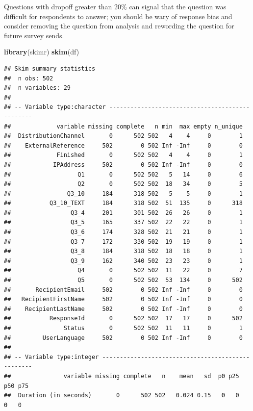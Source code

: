 \documentclass[]{book}
\newenvironment{Shaded}{\begin{snugshade}}{\end{snugshade}}
\newcommand{\KeywordTok}[1]{\textcolor[rgb]{0.13,0.29,0.53}{\textbf{#1}}}
\newcommand{\NormalTok}[1]{#1}
\begin{document}
Questions with dropoff greater than 20\% can signal that the question
was difficult for respondents to answer; you should be wary of response
bias and consider removing the question from analysis and rewording the
question for future survey sends.

\begin{Shaded}
\begin{Highlighting}[]
\KeywordTok{library}\NormalTok{(skimr)}
\KeywordTok{skim}\NormalTok{(df)}
\end{Highlighting}
\end{Shaded}

\begin{verbatim}
## Skim summary statistics
##  n obs: 502 
##  n variables: 29 
## 
## -- Variable type:character ------------------------------------------------
##             variable missing complete   n min  max empty n_unique
##  DistributionChannel       0      502 502   4    4     0        1
##    ExternalReference     502        0 502 Inf -Inf     0        0
##             Finished       0      502 502   4    4     0        1
##            IPAddress     502        0 502 Inf -Inf     0        0
##                   Q1       0      502 502   5   14     0        6
##                   Q2       0      502 502  18   34     0        5
##                Q3_10     184      318 502   5    5     0        1
##           Q3_10_TEXT     184      318 502  51  135     0      318
##                 Q3_4     201      301 502  26   26     0        1
##                 Q3_5     165      337 502  22   22     0        1
##                 Q3_6     174      328 502  21   21     0        1
##                 Q3_7     172      330 502  19   19     0        1
##                 Q3_8     184      318 502  18   18     0        1
##                 Q3_9     162      340 502  23   23     0        1
##                   Q4       0      502 502  11   22     0        7
##                   Q5       0      502 502  53  134     0      502
##       RecipientEmail     502        0 502 Inf -Inf     0        0
##   RecipientFirstName     502        0 502 Inf -Inf     0        0
##    RecipientLastName     502        0 502 Inf -Inf     0        0
##           ResponseId       0      502 502  17   17     0      502
##               Status       0      502 502  11   11     0        1
##         UserLanguage     502        0 502 Inf -Inf     0        0
## 
## -- Variable type:integer --------------------------------------------------
##               variable missing complete   n    mean   sd  p0 p25 p50 p75
##  Duration (in seconds)       0      502 502   0.024 0.15   0   0   0   0

\end{verbatim}
\end{document}
